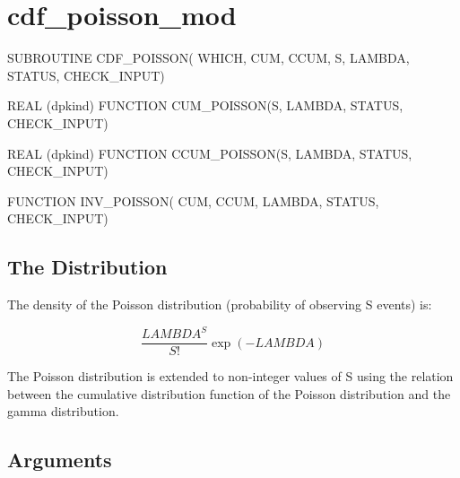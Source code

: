 \documentclass[12pt,dvips]{article}
\newcommand{\mysection}[1]{\color{blue}
             \section{#1} \normalcolor}
\newcommand{\mysubsection}[1] {\color{green}
             \subsection{#1} \normalcolor}
\begin{document}
\pagebreak

\mysection{cdf\_poisson\_mod}

\begin{description}

\item SUBROUTINE CDF\_POISSON( WHICH, CUM, CCUM, S, LAMBDA, STATUS,
    CHECK\_INPUT)

\item REAL (dpkind) FUNCTION
CUM\_POISSON(S, LAMBDA, STATUS, CHECK\_INPUT)

\item REAL (dpkind) FUNCTION CCUM\_POISSON(S, LAMBDA, STATUS,
CHECK\_INPUT)

\item FUNCTION INV\_POISSON( CUM, CCUM, LAMBDA, STATUS, CHECK\_INPUT)

\end{description}

\mysubsection{The Distribution}

The density of the Poisson distribution (probability of observing S
events) is:

\[ \frac{LAMBDA^S}{S!} \exp(-LAMBDA) \]

The Poisson distribution  is extended to non-integer values  of S using
the  relation  between the  cumulative  distribution  function of  the
Poisson distribution and the gamma distribution.

\mysubsection{Arguments}
\end{document}
